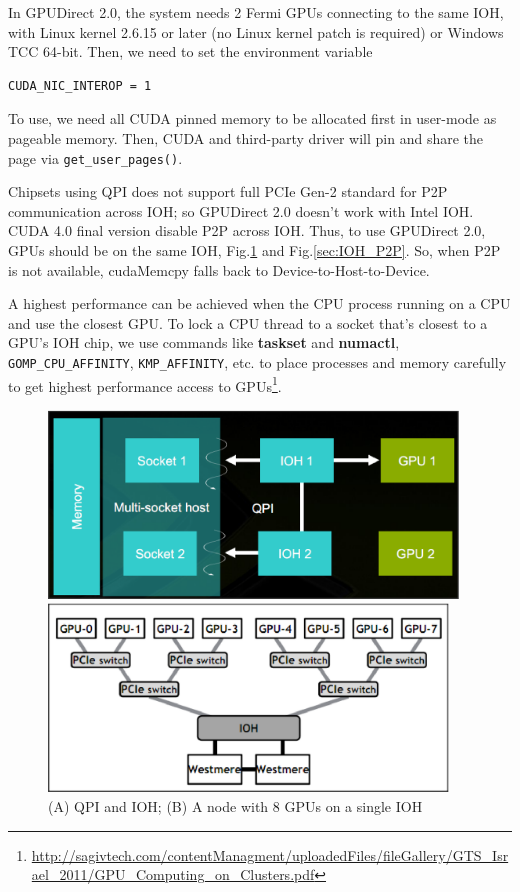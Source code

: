 In GPUDirect 2.0, the system needs 2 Fermi GPUs connecting to the same IOH, with
Linux kernel 2.6.15 or later (no Linux kernel patch is required) or Windows TCC
64-bit. Then, we need to set the environment variable
\begin{lstlisting}
CUDA_NIC_INTEROP = 1
\end{lstlisting}
To use, we need all CUDA pinned memory to be allocated first in user-mode as
pageable memory. Then, CUDA and third-party driver will pin and share the page
via \verb!get_user_pages()!. 

\begin{framed}
Chipsets using QPI does not support full PCIe Gen-2
standard for P2P communication across IOH; so GPUDirect 2.0 doesn't work with
Intel IOH.
CUDA 4.0 final version disable P2P across IOH. Thus, to use GPUDirect 2.0, GPUs
should be on the same IOH, Fig.\ref{fig:QPI_IOH} and Fig.\ref{sec:IOH_P2P}. So,
when P2P is not available, cudaMemcpy falls back to Device-to-Host-to-Device.

A highest performance can be achieved when the CPU process running on a CPU and
use the closest GPU. To lock a CPU thread to a socket that's closest to a GPU's
IOH chip, we use commands like {\bf taskset} and {\bf numactl},
\verb!GOMP_CPU_AFFINITY!, \verb!KMP_AFFINITY!, etc. to place processes and
memory carefully to get highest performance access to
GPUs\footnote{\url{http://sagivtech.com/contentManagment/uploadedFiles/fileGallery/GTS_Israel_2011/GPU_Computing_on_Clusters.pdf}}.
\end{framed}

\begin{figure}[hbt]
  \centerline{\includegraphics[height=5cm,
    angle=0]{./images/QPI_IOH.eps}}
  \centerline{\includegraphics[height=5cm,
    angle=0]{./images/IOH_8GPU.eps}}
\caption{(A) QPI and IOH; (B) A node with 8 GPUs on a single IOH}
\label{fig:QPI_IOH}
\end{figure}

